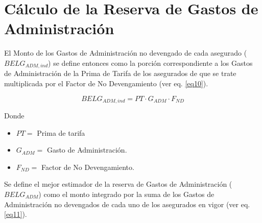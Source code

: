 \documentclass[11pt,twoside,openright,spanish]{report}
\numberwithin{equation}{chapter}
\numberwithin{figure}{chapter}
\numberwithin{table}{chapter}
\begin{document}
\section{Cálculo de la Reserva de Gastos de Administración}





El  Monto de los Gastos de Administración no devengado de cada asegurado ($BELG_{ADM,ind}$) se define entonces como la porción correspondiente a los Gastos de Administración de la Prima de Tarifa de los asegurados de que se trate multiplicada por el Factor de No Devengamiento (ver eq. \ref{eq10}). 

\begin{equation}
	BELG_{ADM,ind}=	PT \cdot G_{ADM} \cdot F_{ND}
	\label{eq10}
\end{equation}



Donde

\begin{itemize}
	\setlength\itemsep{-0.5em}
	\item $PT=$ Prima de tarifa
	
	\item $G_{ADM}^{}=$ Gasto de Administración.
	
	\item $F_{ND}^{}=$ Factor de No Devengamiento.
\end{itemize}

Se define el mejor estimador de la reserva de Gastos de Administración ($BELG_{ADM}$) como el monto integrado por la suma de los Gastos de Administración no devengados de cada uno de los asegurados en vigor (ver eq. \ref{eq11}).
\end{document}
